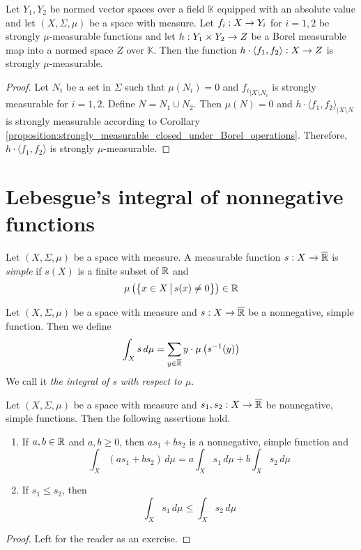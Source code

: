 \begin{corollary}\label{corollary:mu_strongly_measurable_closed_under_Borel_operations}
Let $Y_1, Y_2$ be normed vector spaces over a field $\mathbb{K}$ equipped with an absolute value and let $(X,\Sigma,\mu)$ be a space with measure. Let $f_i:X\rightarrow Y_i$ for $i=1,2$ be strongly $\mu$-measurable functions and let $h:Y_1\times Y_2\rightarrow Z$ be a Borel measurable map into a normed space $Z$ over $\mathbb{K}$. Then the function $h\cdot \langle f_1,f_2\rangle:X\rightarrow Z$ is strongly $\mu$-measurable.
\end{corollary}
\begin{proof}
Let $N_i$ be a set in $\Sigma$ such that $\mu(N_i) = 0$ and ${f_i}_{\mid X\setminus N_i}$ is strongly measurable for $i=1,2$. Define $N = N_1\cup N_2$. Then $\mu(N) = 0$ and $h\cdot \langle f_1,f_2\rangle_{\mid X\setminus N}$ is strongly measurable according to Corollary \ref{proposition:strongly_measurable_closed_under_Borel_operations}. Therefore, $h\cdot \langle f_1,f_2\rangle$ is strongly $\mu$-measurable.
\end{proof}

\section{Lebesgue's integral of nonnegative functions}\label{section:lebesgues_integration}

\begin{definition}
Let $(X,\Sigma,\mu)$ be a space with measure. A measurable function $s:X\rightarrow \overline{{\mathbb R}}$ is \textit{simple} if $s(X)$ is a finite subset of ${\mathbb R}$ and
$$\mu\left(\big\{x\in X\,\big|\,s(x)\neq 0\big\}\right) \in {\mathbb R}$$
\end{definition}

\begin{definition}
Let $(X,\Sigma,\mu)$ be a space with measure and $s:X\rightarrow \overline{{\mathbb R}}$ be a nonnegative, simple function. Then we define
$$\int_Xs\,d\mu = \sum_{y\in \overline{{\mathbb R}}}y\cdot \mu\left(s^{-1}(y)\right)$$
We call it \textit{the integral of $s$ with respect to $\mu$}.
\end{definition}

\begin{fact}\label{fact:basics_for_simple_functions}
Let $(X,\Sigma,\mu)$ be a space with measure and $s_1, s_2:X\rightarrow \overline{{\mathbb R}}$ be nonnegative, simple functions. Then the following assertions hold.
\begin{enumerate}[label=\emph{\textbf{(\arabic*)}}, leftmargin=*]
\item If $a, b\in {\mathbb R}$ and $a, b\geq 0$, then $a s_1 + b s_2$ is a nonnegative, simple function and 
$$\int_X\left(a s_1 + b s_2\right)\,d\mu = a \int_Xs_1\,d\mu + b \int_Xs_2\,d\mu$$
\item If $s_1\leq s_2$, then
$$\int_Xs_1\,d\mu \leq \int_Xs_2\,d\mu$$
\end{enumerate}
\end{fact}
\begin{proof}
Left for the reader as an exercise.
\end{proof}

